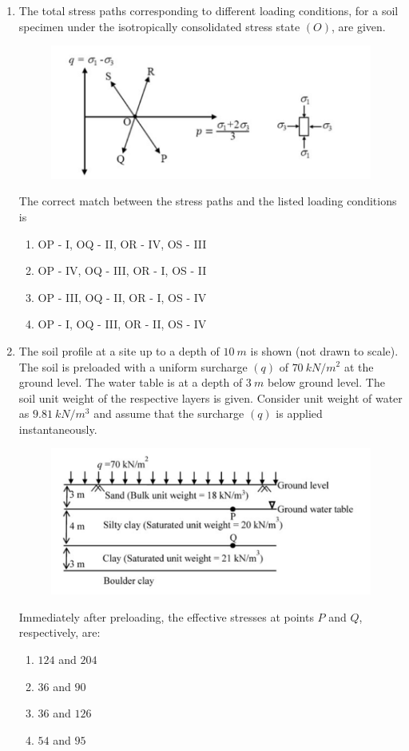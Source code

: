 \documentclass[journal]{IEEEtran}
\begin{document}
\begin{enumerate}
\item The total stress paths corresponding to different loading conditions, for a soil specimen under the isotropically consolidated stress state $(O)$, are given.  

\begin{figure}[H]
    \centering
    \includegraphics[width=0.3\columnwidth]{figs/Q44.png} 
    \caption{}
    \label{fig:placeholder}
\end{figure}



The correct match between the stress paths and the listed loading conditions is  \hfill {}
\begin{enumerate}
\item OP - I, OQ - II, OR - IV, OS - III  
\item OP - IV, OQ - III, OR - I, OS - II  
\item OP - III, OQ - II, OR - I, OS - IV  
\item OP - I, OQ - III, OR - II, OS - IV  
\end{enumerate}

\item The soil profile at a site up to a depth of $10 \ m$ is shown (not drawn to scale). The soil is preloaded with a uniform surcharge $(q)$ of $70 \ kN/m^2$ at the ground level. The water table is at a depth of $3 \ m$ below ground level. The soil unit weight of the respective layers is given. Consider unit weight of water as $9.81 \ kN/m^3$ and assume that the surcharge $(q)$ is applied instantaneously.  

\begin{figure}[H]
    \centering
    \includegraphics[width=0.3\columnwidth]{figs/Q45.png} 
    \caption{}
    \label{fig:placeholder}
\end{figure}

Immediately after preloading, the effective stresses  at points $P$ and $Q$, respectively, are:  \hfill {}
\begin{enumerate}
\item $124$ and $204$  
\item $36$ and $90$  
\item $36$ and $126$  
\item $54$ and $95$  
\end{enumerate}


\end{enumerate}
\end{document}
